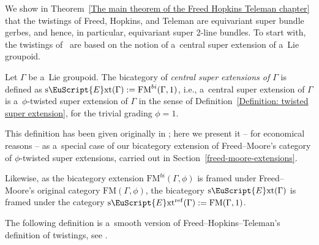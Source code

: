 \documentclass[10pt,a4paper]{amsart}
\numberwithin{equation}{section}
\def\mathscr#1{\EuScript{#1}}
\def\sExt{\normalfont\text{s}\mathscr{E}\text{xt}}
\begin{document}
We show in
Theorem~\ref{The main theorem of the Freed Hopkins Teleman chapter} that the twistings of Freed, Hopkins, and Teleman are equivariant super bundle gerbes, and hence, in particular, equivariant super 2-line bundles.
To start with, the twistings of~\cite{Freed2011a} are based on the notion of a~central super extension of a~Lie groupoid.


\begin{Definition} \label{Definition: central super extension}
Let $\Gamma$ be a~Lie groupoid. The bicategory of \emph{central super extensions of $\Gamma$} is defined as
$
\sExt(\Gamma) := \mathrm{FM}^{bi}(\Gamma,1)$,
i.e., a~central super extension of $\Gamma$ is a~$\phi$-twisted super extension of $\Gamma$ in the sense of
 Definition~\ref{Definition: twisted super extension}, for the trivial grading $\phi=1$.
\end{Definition}



This definition has been given originally in \cite[Section~2]{Freed2011a}; here we present it -- for economical reasons -- as a~special case of our bicategory extension of Freed--Moore's category of $\phi$-twisted super extensions, carried out in Section~\ref{freed-moore-extensions}.

\begin{Remark}
\label{sExtref}
Likewise, as the bicategory extension $\mathrm{FM}^{bi}(\Gamma,\phi)$ is framed under Freed--Moore's original category $\mathrm{FM}(\Gamma,\phi)$, the bicategory $\sExt(\Gamma)$ is framed under the category $\sExt^\mathrm{ref}(\Gamma) := \mathrm{FM}(\Gamma,1)$.

\end{Remark}


The following definition is a~smooth version of Freed--Hopkins--Teleman's definition of twistings, see \cite[Section~2.3]{Freed2011a}.
\end{document}
